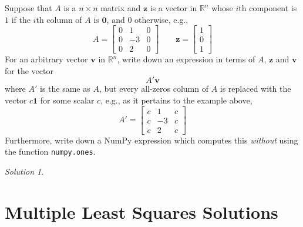 \documentclass{article}
\newcommand{\vv}[1]{\mathbf{#1}}
\newcommand{\R}{\mathbb R}
\theoremstyle{remark}
\newtheorem*{solution}{Solution}
\begin{document}
Suppose that $A$ is a $n \times n$ matrix and $\vv z$ is a vector in $\R^n$ whose $i$th component is $1$ if the $i$th column of $A$ is $\vv 0$, and $0$ otherwise, e.g.,
\begin{displaymath}
  A =
  \begin{bmatrix}
    0 & 1 & 0 \\
    0 & -3 & 0 \\
    0 & 2 & 0
  \end{bmatrix}
  \qquad
  \vv z =
  \begin{bmatrix}
    1 \\ 0 \\ 1
  \end{bmatrix}
\end{displaymath}
For an arbitrary vector $\vv v$ in $\R^n$, write down an expression in terms of $A$, $\vv z$ and $\vv v$ for the vector
\begin{displaymath}
  A' \vv v
\end{displaymath}
where $A'$ is the same as $A$, but every all-zeros column of $A$ is replaced with the vector $c\vv 1$ for some scalar $c$, e.g., as it pertains to the example above,
\begin{displaymath}
  A' =
  \begin{bmatrix}
    c & 1 & c \\
    c & -3 & c \\
    c & 2 & c
  \end{bmatrix}
\end{displaymath}
Furthermore, write down a NumPy expression which computes this \textit{without} using the function \texttt{numpy.ones}.

\begin{solution}
\end{solution}

\pagebreak
\section{Multiple Least Squares Solutions}
\end{document}

